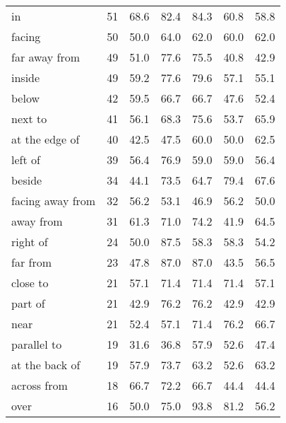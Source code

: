 \begin{table}[ht]
\begin{adjustbox}{max width=0.7\textwidth}
\begin{tabular}{lrrrrrr}
in                   &      51 &        68.6 &    82.4 &  84.3 &        60.8 &        58.8 \\
facing               &      50 &        50.0 &    64.0 &  62.0 &        60.0 &        62.0 \\
far away from        &      49 &        51.0 &    77.6 &  75.5 &        40.8 &        42.9 \\
inside               &      49 &        59.2 &    77.6 &  79.6 &        57.1 &        55.1 \\
below                &      42 &        59.5 &    66.7 &  66.7 &        47.6 &        52.4 \\
next to              &      41 &        56.1 &    68.3 &  75.6 &        53.7 &        65.9 \\
at the edge of       &      40 &        42.5 &    47.5 &  60.0 &        50.0 &        62.5 \\
left of              &      39 &        56.4 &    76.9 &  59.0 &        59.0 &        56.4 \\
beside               &      34 &        44.1 &    73.5 &  64.7 &        79.4 &        67.6 \\
facing away from     &      32 &        56.2 &    53.1 &  46.9 &        56.2 &        50.0 \\
away from            &      31 &        61.3 &    71.0 &  74.2 &        41.9 &        64.5 \\
right of             &      24 &        50.0 &    87.5 &  58.3 &        58.3 &        54.2 \\
far from             &      23 &        47.8 &    87.0 &  87.0 &        43.5 &        56.5 \\
close to             &      21 &        57.1 &    71.4 &  71.4 &        71.4 &        57.1 \\
part of              &      21 &        42.9 &    76.2 &  76.2 &        42.9 &        42.9 \\
near                 &      21 &        52.4 &    57.1 &  71.4 &        76.2 &        66.7 \\
parallel to          &      19 &        31.6 &    36.8 &  57.9 &        52.6 &        47.4 \\
at the back of       &      19 &        57.9 &    73.7 &  63.2 &        52.6 &        63.2 \\
across from          &      18 &        66.7 &    72.2 &  66.7 &        44.4 &        44.4 \\
over                 &      16 &        50.0 &    75.0 &  93.8 &        81.2 &        56.2 \\

\end{tabular}
\end{adjustbox}
\end{table}
